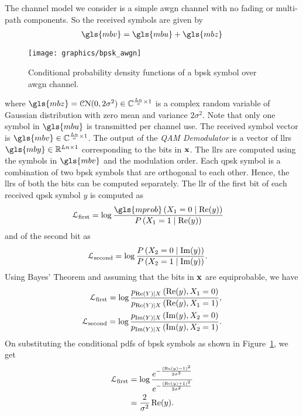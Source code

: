 The channel model we consider is a simple \gls{awgn} channel with no fading or multi-path components. So the received symbols are given by \begin{align}\gls{mbv}=\gls{mbu}+\gls{mbz}\end{align}
\begin{figure}[htbp]
  \centering
  \texttt{[image: graphics/bpsk\_awgn]}
  \caption{Conditional probability density functions of a \gls{bpsk} symbol over \gls{awgn} channel.}
  \label{fig:bpsk_awgn}
\end{figure}
where $\gls{mbz}=\mathcal{CN}(0,2\sigma^2)\in\mathbb{C}^{\frac{Ln}{o}\times 1}$ is a complex random variable of Gaussian distribution with zero mean and variance $2\sigma^2$. Note that only one symbol in $\gls{mbu}$ is transmitted per channel use. The received symbol vector is $\gls{mbv}\in\mathbb{C}^{\frac{Ln}{o}\times 1}$. The output of the \emph{QAM Demodulator} is a vector of \glspl{llr} $\gls{mby}\in\mathbb{R}^{Ln\times 1}$ corresponding to the bits in $\mathbf{x}$. The \glspl{llr} are computed using the symbols in $\gls{mbv}$ and the modulation order. Each \gls{qpsk} symbol is a combination of two \gls{bpsk} symbols that are orthogonal to each other. Hence, the \glspl{llr} of both the bits can be computed separately. The \gls{llr} of the first bit of each received \gls{qpsk} symbol $y$ is computed as
\begin{align}
\mathcal{L}_{\text{first}}&=\log\frac{\gls{mprob}\left(X_1=0\mid\re(y)\right)}{\prob\left(X_1=1\mid\re(y)\right)}
\end{align}
and of the second bit as
\begin{align}
\mathcal{L}_{\text{second}}&=\log\frac{P\left(X_2=0\mid\operatorname{Im}(y)\right)}{P\left(X_2=1\mid\operatorname{Im}(y)\right)}.
\end{align}
Using Bayes' Theorem and assuming that the bits in $\mathbf{x}$ are equiprobable, we have
\begin{align}
\mathcal{L}_{\text{first}}=\log\frac{p_{\operatorname{Re}(Y)\mid X}\left(\operatorname{Re}(y), X_1=0\right)}{p_{\operatorname{Re}(Y)\mid X}\left(\operatorname{Re}(y), X_1=1\right)},\\
\mathcal{L}_{\text{second}}=\log\frac{p_{\operatorname{Im}(Y)\mid X}\left(\operatorname{Im}(y), X_2=0\right)}{p_{\operatorname{Im}(Y)\mid X}\left(\operatorname{Im}(y), X_2=1\right)}.
\end{align}
On substituting the conditional \glspl{pdf} of \gls{bpsk} symbols as shown in Figure~\ref{fig:bpsk_awgn}, we get
\begin{align}
\mathcal{L}_{\text{first}}&=\log\frac{e^{-\frac{(\operatorname{Re}(y)-1)^2}{2\sigma^2}}}{e^{-\frac{(\operatorname{Re}(y)+1)^2}{2\sigma^2}}}\\
&=\frac{2}{\sigma^2}\operatorname{Re}(y)\label{eq:final_llr1}.
\end{align}
